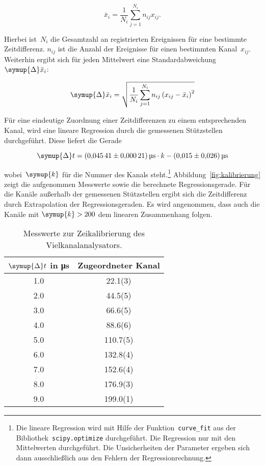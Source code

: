 \begin{equation}
  \bar{x}_i=\frac{1}{N_i}\sum_{j=1}^{N_i}n_{ij}x_{ij}.
  \label{eq:kanal_mittelwert}
\end{equation}

Hierbei ist~$N_i$ die Gesamtzahl an registrierten Ereignissen für eine bestimmte
Zeitdifferenz. $n_{ij}$ ist die Anzahl der Ereignisse für einen bestimmten
Kanal~$x_{ij}$. Weiterhin ergibt sich für jeden Mittelwert eine
Standardabweichung~$\symup{\Delta}\bar{x}_i$:

\begin{equation}
  \symup{\Delta}\bar{x}_i=\sqrt{\frac{1}{N_i}\sum_{j=1}^{N_i}n_{ij}\left(x_{ij}-\bar{x}_i\right)^2}
  \label{eq:kanal_standardabweichung}
\end{equation}

Für eine eindeutige Zuordnung einer Zeitdifferenzen zu einem entsprechenden Kanal,
wird eine lineare Regression durch die gemessenen Stützstellen durchgeführt. Diese
liefert die Gerade

\begin{equation}
  \symup{\Delta}t=\SI{0.04541(21)}{\micro\second}\cdot k-\SI{0.015(26)}{\micro\second}
  \label{eq:kalibrierung}
\end{equation}

wobei~$\symup{k}$ für die Nummer des Kanals steht.\footnote{Die lineare
Regression wird mit Hilfe der Funktion~\texttt{curve\_fit} aus der
Bibliothek~\texttt{scipy.optimize} durchgeführt. Die Regression nur mit den
Mittelwerten durchgeführt. Die Unsicherheiten der Parameter ergeben sich dann ausschließlich
aus den Fehlern der Regressionrechnung.} Abbildung~\ref{fig:kalibrierung} zeigt
die aufgenommen Messwerte sowie die berechnete Regressionsgerade. Für die Kanäle
außerhalb der gemessenen Stützstellen ergibt sich die Zeitdifferenz durch Extrapolation
der Regressionsgeraden. Es wird angenommen, dass auch die Kanäle mit $\symup{k}>200$
dem linearen Zusammenhang folgen.

\begin{table}[htb]
  \centering
  \caption{Messwerte zur Zeikalibrierung des Vielkanalanalysators.}
  \begin{tabular}{S[table-format = 2.1] S[table-format = 3.1(1)]}
    \toprule
    {$\symup{\Delta}t$ in \si{\micro\second}} & {Zugeordneter Kanal} \\
     &  22.1(3) \\
    2.0 &  44.5(5) \\
    3.0 &  66.6(5) \\
    4.0 &  88.6(6) \\
    5.0 & 110.7(5) \\
    6.0 & 132.8(4) \\
    7.0 & 152.6(4) \\
    8.0 & 176.9(3) \\
    9.0 & 199.0(1) \\
    \bottomrule
  \end{tabular}
  \label{tab:kalibrierung}
\end{table}

